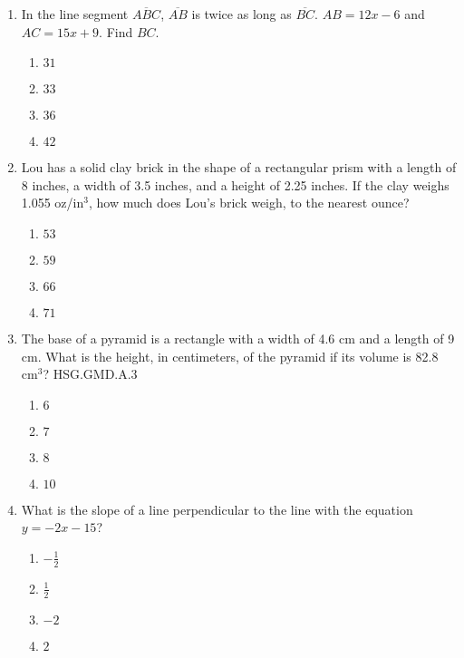 \documentclass[12pt, twoside]{article}
\begin{document}
\begin{enumerate}
\item In the line segment $\overline{ABC}$, $\overline{AB}$ is twice as long as $\overline{BC}$. $AB=12x-6$ and $AC=15x+9$. Find $BC$.
  \begin{multicols}{2}
  \begin{enumerate}
    \item $31$
    \item $33$
    \item $36$
    \item $42$
  \end{enumerate}
  \end{multicols} \vspace{1cm}

\item Lou has a solid clay brick in the shape of a rectangular prism with a length of 8 inches, a width of 3.5 inches, and a height of 2.25 inches. If the clay weighs 1.055 oz/in$^3$, how much does Lou's brick weigh, to the nearest ounce? 
  \begin{multicols}{2}
    \begin{enumerate}
    \item $53$
    \item $59$
    \item $66$
    \item $71$
  \end{enumerate}
  \end{multicols} \vspace{1.5cm}
  
\item The base of a pyramid is a rectangle with a width of 4.6 cm and a length of 9 cm. What is the height, in centimeters, of the pyramid if its volume is 82.8 cm$^3$? \hfill HSG.GMD.A.3
\begin{multicols}{2}
  \begin{enumerate}
    \item $6$
    \item $7$
    \item $8$
    \item $10$
  \end{enumerate}
  \end{multicols} \vspace{0.5cm}

\newpage
\item What is the slope of a line perpendicular to the line with the equation $y=-2x-15$?
  \begin{multicols}{2}
    \begin{enumerate}
      \item $-\frac{1}{2}$
      \item $\frac{1}{2}$ 
      \item $-2$
      \item $2$
    \end{enumerate}
  \end{multicols}


\end{enumerate}
\end{document}
